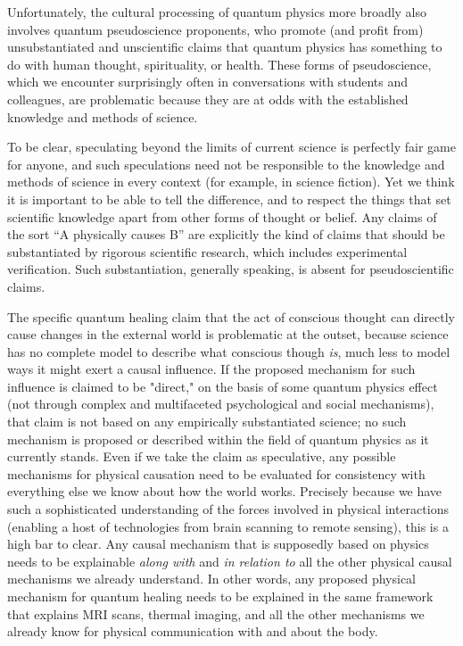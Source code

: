 \documentclass[12pt,onecolumn,preprintnumbers,amsmath,amssymbn,reprint,nofootinbib,superscriptaddress]{revtex4}    %
\begin{document}
Unfortunately, the cultural processing of quantum physics more broadly also involves quantum pseudoscience proponents, who promote (and profit from) unsubstantiated and unscientific claims that quantum physics has something to do with human thought, spirituality, or health\cite{Pessoa}.  These forms of pseudoscience, which we encounter surprisingly often in conversations with students and colleagues, are problematic because they are at odds with the established knowledge and methods of science. 

To be clear, speculating beyond the limits of current science is perfectly fair game for anyone, and such speculations need not be responsible to the knowledge and methods of science in every context (for example, in science fiction).  Yet we think it is important to be able to tell the difference, and to respect the things that set scientific knowledge apart from other forms of thought or belief. Any claims of the sort ``A physically causes B'' are explicitly the kind of claims that should be substantiated by rigorous scientific research, which includes experimental verification.  
Such substantiation, generally speaking, is absent for pseudoscientific claims.  

The specific quantum healing claim that the act of conscious thought can directly cause changes in the external world is problematic at the outset, because science has no complete model to describe what conscious though {\em is}, much less to model ways it might exert a causal influence. If the proposed mechanism for such influence is claimed to be "direct," on the basis of some quantum physics effect (not through complex and multifaceted psychological and social mechanisms), that claim is not based on any empirically substantiated science; no such mechanism is proposed or described within the field of quantum physics as it currently stands.  Even if we take the claim as speculative, any possible mechanisms for physical causation need to be evaluated for consistency with everything else we know about how the world works. Precisely because we have such a sophisticated understanding of the forces involved in physical interactions (enabling a host of technologies from brain scanning to remote sensing), this is a high bar to clear. Any causal mechanism that is supposedly based on physics needs to be explainable {\em along with} and {\em in relation to} all the other physical causal mechanisms we already understand.  In other words, any proposed physical mechanism for quantum healing needs to be explained in the same framework that explains MRI scans, thermal imaging, and all the other mechanisms we already know for physical communication with and about the body.   
\end{document}
